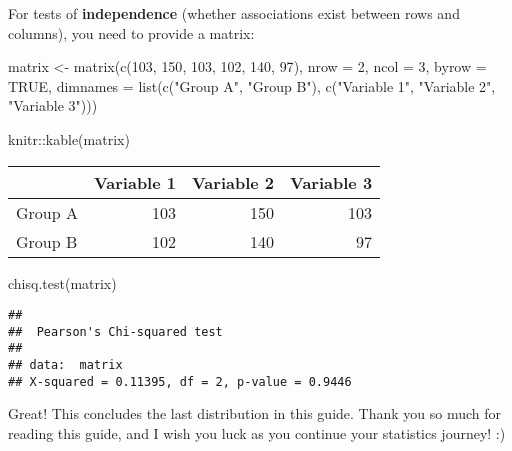 \documentclass[
]{article}
\newenvironment{Shaded}{\begin{snugshade}}{\end{snugshade}}
\newcommand{\AttributeTok}[1]{\textcolor[rgb]{0.77,0.63,0.00}{#1}}
\newcommand{\ConstantTok}[1]{\textcolor[rgb]{0.00,0.00,0.00}{#1}}
\newcommand{\DecValTok}[1]{\textcolor[rgb]{0.00,0.00,0.81}{#1}}
\newcommand{\FunctionTok}[1]{\textcolor[rgb]{0.00,0.00,0.00}{#1}}
\newcommand{\NormalTok}[1]{#1}
\newcommand{\OtherTok}[1]{\textcolor[rgb]{0.56,0.35,0.01}{#1}}
\newcommand{\SpecialCharTok}[1]{\textcolor[rgb]{0.00,0.00,0.00}{#1}}
\newcommand{\StringTok}[1]{\textcolor[rgb]{0.31,0.60,0.02}{#1}}
\begin{document}
For tests of \textbf{independence} (whether associations exist between rows and columns), you need to provide a matrix:

\begin{Shaded}
\begin{Highlighting}[]
\NormalTok{ matrix }\OtherTok{\textless{}{-}} \FunctionTok{matrix}\NormalTok{(}\FunctionTok{c}\NormalTok{(}\DecValTok{103}\NormalTok{, }\DecValTok{150}\NormalTok{, }\DecValTok{103}\NormalTok{, }\DecValTok{102}\NormalTok{, }\DecValTok{140}\NormalTok{, }\DecValTok{97}\NormalTok{),}
                 \AttributeTok{nrow =} \DecValTok{2}\NormalTok{, }\AttributeTok{ncol =} \DecValTok{3}\NormalTok{, }\AttributeTok{byrow =} \ConstantTok{TRUE}\NormalTok{, }
                 \AttributeTok{dimnames =} \FunctionTok{list}\NormalTok{(}\FunctionTok{c}\NormalTok{(}\StringTok{"Group A"}\NormalTok{, }\StringTok{"Group B"}\NormalTok{), }
                                 \FunctionTok{c}\NormalTok{(}\StringTok{"Variable 1"}\NormalTok{, }\StringTok{"Variable 2"}\NormalTok{, }\StringTok{"Variable 3"}\NormalTok{)))}

\NormalTok{knitr}\SpecialCharTok{::}\FunctionTok{kable}\NormalTok{(matrix)}
\end{Highlighting}
\end{Shaded}

\begin{tabular}{l|r|r|r}
\hline
  & Variable 1 & Variable 2 & Variable 3\\
\hline
Group A & 103 & 150 & 103\\
\hline
Group B & 102 & 140 & 97\\
\hline
\end{tabular}

\begin{Shaded}
\begin{Highlighting}[]
\FunctionTok{chisq.test}\NormalTok{(matrix)}
\end{Highlighting}
\end{Shaded}

\begin{verbatim}
## 
##  Pearson's Chi-squared test
## 
## data:  matrix
## X-squared = 0.11395, df = 2, p-value = 0.9446
\end{verbatim}

Great! This concludes the last distribution in this guide. Thank you so much for reading this guide, and I wish you luck as you continue your statistics journey! :)

  
\end{document}
